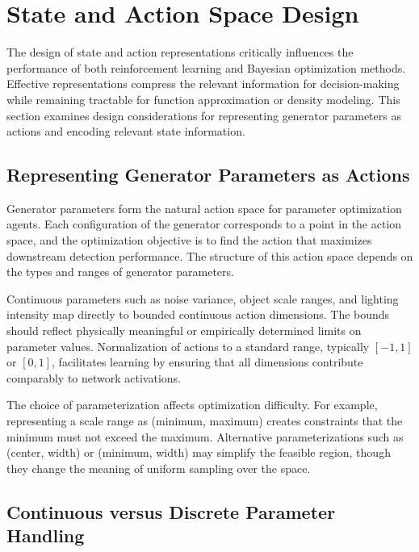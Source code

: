 \section{State and Action Space Design}
\label{sec:state_action_design}

The design of state and action representations critically influences the performance of both reinforcement learning and Bayesian optimization methods. Effective representations compress the relevant information for decision-making while remaining tractable for function approximation or density modeling. This section examines design considerations for representing generator parameters as actions and encoding relevant state information.

\subsection{Representing Generator Parameters as Actions}
\label{subsec:parameter_actions}

Generator parameters form the natural action space for parameter optimization agents. Each configuration of the generator corresponds to a point in the action space, and the optimization objective is to find the action that maximizes downstream detection performance. The structure of this action space depends on the types and ranges of generator parameters.

Continuous parameters such as noise variance, object scale ranges, and lighting intensity map directly to bounded continuous action dimensions. The bounds should reflect physically meaningful or empirically determined limits on parameter values. Normalization of actions to a standard range, typically $[-1, 1]$ or $[0, 1]$, facilitates learning by ensuring that all dimensions contribute comparably to network activations.

The choice of parameterization affects optimization difficulty. For example, representing a scale range as (minimum, maximum) creates constraints that the minimum must not exceed the maximum. Alternative parameterizations such as (center, width) or (minimum, width) may simplify the feasible region, though they change the meaning of uniform sampling over the space.

\subsection{Continuous versus Discrete Parameter Handling}
\label{subsec:continuous_discrete}

